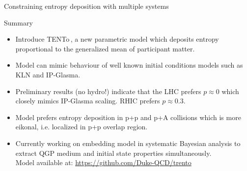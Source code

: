 \documentclass[svgnames]{beamer}
\newcommand{\trento}{T\raisebox{-.5ex}{R}ENTo}
\begin{document}
\begin{frame}{Constraining entropy deposition with multiple systems}
 \centering
 \vspace{0.1 in} 
\end{frame}

\begin{frame}{Summary}
\begin{itemize}
 \item Introduce \trento\,, a new parametric model which deposits entropy proportional to the generalized mean of participant matter.
 \item Model can mimic behaviour of well known initial conditions models such as KLN and IP-Glasma.
 \item Preliminary results (no hydro!) indicate that the LHC prefers $p \approx 0$ which closely mimics IP-Glasma scaling. RHIC prefers $p \approx 0.3$.
 \item Model prefers entropy deposition in p+p and p+A collisions which is more eikonal, i.e. localized in p+p overlap region.
 \item Currently working on embedding model in systematic Bayesian analysis to extract QGP medium and initial state properties simultaneously.\\
 \vspace{0.2 in}
 \centering Model available at: \url{https://github.com/Duke-QCD/trento}
\end{itemize}

 
\end{frame}
\end{document}
